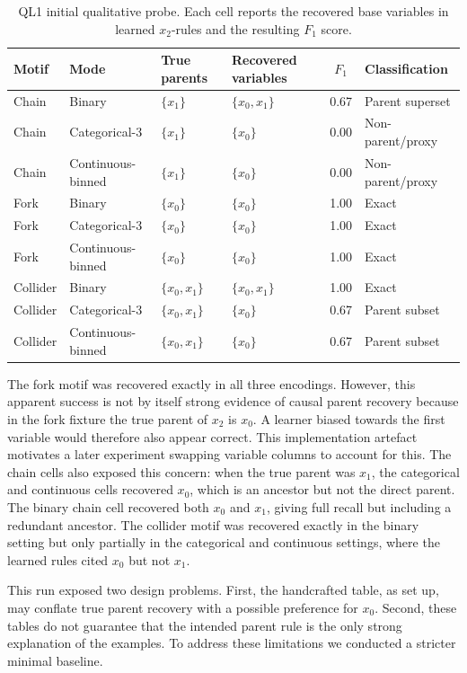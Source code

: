 \begin{table}[htbp]
\centering
\caption{QL1 initial qualitative probe. Each cell reports the recovered base variables in learned \(x_2\)-rules and the resulting \(F_1\) score.}
\label{tab:ql1-results}
\begin{tabular}{llllcl}
\toprule
Motif & Mode & True parents & Recovered variables & \(F_1\) & Classification \\
\midrule
Chain & Binary & \(\{x_1\}\) & \(\{x_0,x_1\}\) & 0.67 & Parent superset \\
Chain & Categorical-3 & \(\{x_1\}\) & \(\{x_0\}\) & 0.00 & Non-parent/proxy \\
Chain & Continuous-binned & \(\{x_1\}\) & \(\{x_0\}\) & 0.00 & Non-parent/proxy \\
Fork & Binary & \(\{x_0\}\) & \(\{x_0\}\) & 1.00 & Exact \\
Fork & Categorical-3 & \(\{x_0\}\) & \(\{x_0\}\) & 1.00 & Exact \\
Fork & Continuous-binned & \(\{x_0\}\) & \(\{x_0\}\) & 1.00 & Exact \\
Collider & Binary & \(\{x_0,x_1\}\) & \(\{x_0,x_1\}\) & 1.00 & Exact \\
Collider & Categorical-3 & \(\{x_0,x_1\}\) & \(\{x_0\}\) & 0.67 & Parent subset \\
Collider & Continuous-binned & \(\{x_0,x_1\}\) & \(\{x_0\}\) & 0.67 & Parent subset \\
\bottomrule
\end{tabular}
\end{table}

The fork motif was recovered exactly in all three encodings. However, this apparent success is not by itself strong evidence of causal parent recovery because in the fork fixture the true parent of \(x_2\) is \(x_0\). A learner biased towards the first variable would therefore also appear correct. This implementation artefact motivates a later experiment swapping variable columns to account for this. The chain cells also exposed this concern: when the true parent was \(x_1\), the categorical and continuous cells recovered \(x_0\), which is an ancestor but not the direct parent. The binary chain cell recovered both \(x_0\) and \(x_1\), giving full recall but including a redundant ancestor. The collider motif was recovered exactly in the binary setting but only partially in the categorical and continuous settings, where the learned rules cited \(x_0\) but not \(x_1\).

This run exposed two design problems. First, the handcrafted table, as set up, may conflate true parent recovery with a possible preference for \(x_0\). Second, these tables do not guarantee that the intended parent rule is the only strong explanation of the examples. To address these limitations we conducted a stricter minimal baseline.

